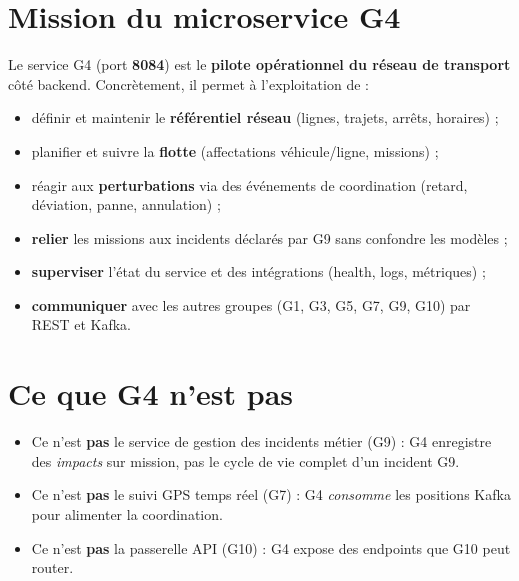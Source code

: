 \documentclass[12pt,a4paper]{report}
\begin{document}
\section{Mission du microservice G4}
Le service G4 (port \textbf{8084}) est le \textbf{pilote opérationnel du réseau de transport} côté backend. Concrètement, il permet à l'exploitation de :
\begin{itemize}[leftmargin=*]
    \item définir et maintenir le \textbf{référentiel réseau} (lignes, trajets, arrêts, horaires) ;
    \item planifier et suivre la \textbf{flotte} (affectations véhicule/ligne, missions) ;
    \item réagir aux \textbf{perturbations} via des événements de coordination (retard, déviation, panne, annulation) ;
    \item \textbf{relier} les missions aux incidents déclarés par G9 sans confondre les modèles ;
    \item \textbf{superviser} l'état du service et des intégrations (health, logs, métriques) ;
    \item \textbf{communiquer} avec les autres groupes (G1, G3, G5, G7, G9, G10) par REST et Kafka.
\end{itemize}

\section{Ce que G4 n'est pas}
\begin{itemize}[leftmargin=*]
    \item Ce n'est \textbf{pas} le service de gestion des incidents métier (G9) : G4 enregistre des \textit{impacts} sur mission, pas le cycle de vie complet d'un incident G9.
    \item Ce n'est \textbf{pas} le suivi GPS temps réel (G7) : G4 \textit{consomme} les positions Kafka pour alimenter la coordination.
    \item Ce n'est \textbf{pas} la passerelle API (G10) : G4 expose des endpoints que G10 peut router.
\end{itemize}
\end{document}
